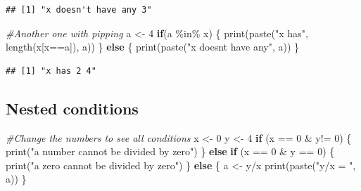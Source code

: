 \documentclass[
]{book}
\newenvironment{Shaded}{\begin{snugshade}}{\end{snugshade}}
\newcommand{\CommentTok}[1]{\textcolor[rgb]{0.56,0.35,0.01}{\textit{#1}}}
\newcommand{\ControlFlowTok}[1]{\textcolor[rgb]{0.13,0.29,0.53}{\textbf{#1}}}
\newcommand{\DecValTok}[1]{\textcolor[rgb]{0.00,0.00,0.81}{#1}}
\newcommand{\FunctionTok}[1]{\textcolor[rgb]{0.00,0.00,0.00}{#1}}
\newcommand{\NormalTok}[1]{#1}
\newcommand{\OtherTok}[1]{\textcolor[rgb]{0.56,0.35,0.01}{#1}}
\newcommand{\SpecialCharTok}[1]{\textcolor[rgb]{0.00,0.00,0.00}{#1}}
\newcommand{\StringTok}[1]{\textcolor[rgb]{0.31,0.60,0.02}{#1}}
\theoremstyle{definition}
\theoremstyle{definition}
\theoremstyle{definition}
\theoremstyle{definition}
\theoremstyle{remark}
\begin{document}
\begin{verbatim}
## [1] "x doesn't have any 3"
\end{verbatim}

\begin{Shaded}
\begin{Highlighting}[]
\CommentTok{\#Another one with pipping}
\NormalTok{a }\OtherTok{\textless{}{-}} \DecValTok{4}
\ControlFlowTok{if}\NormalTok{(a }\SpecialCharTok{\%in\%}\NormalTok{ x) \{}
  \FunctionTok{print}\NormalTok{(}\FunctionTok{paste}\NormalTok{(}\StringTok{"x has"}\NormalTok{, }\FunctionTok{length}\NormalTok{(x[x}\SpecialCharTok{==}\NormalTok{a]), a))}
\NormalTok{\} }\ControlFlowTok{else}\NormalTok{ \{}
  \FunctionTok{print}\NormalTok{(}\FunctionTok{paste}\NormalTok{(}\StringTok{"x doesn\textquotesingle{}t have any"}\NormalTok{, a))}
\NormalTok{\}}
\end{Highlighting}
\end{Shaded}

\begin{verbatim}
## [1] "x has 2 4"
\end{verbatim}

\hypertarget{nested-conditions}{%
\subsection{Nested conditions}\label{nested-conditions}}

\begin{Shaded}
\begin{Highlighting}[]
\CommentTok{\#Change the numbers to see all conditions}
\NormalTok{x }\OtherTok{\textless{}{-}} \DecValTok{0}
\NormalTok{y }\OtherTok{\textless{}{-}} \DecValTok{4}
\ControlFlowTok{if}\NormalTok{ (x }\SpecialCharTok{==} \DecValTok{0} \SpecialCharTok{\&}\NormalTok{ y}\SpecialCharTok{!=} \DecValTok{0}\NormalTok{) \{}
  \FunctionTok{print}\NormalTok{(}\StringTok{"a number cannot be divided by zero"}\NormalTok{)}
\NormalTok{\} }\ControlFlowTok{else} \ControlFlowTok{if}\NormalTok{ (x }\SpecialCharTok{==} \DecValTok{0} \SpecialCharTok{\&}\NormalTok{ y }\SpecialCharTok{==} \DecValTok{0}\NormalTok{) \{}
  \FunctionTok{print}\NormalTok{(}\StringTok{"a zero cannot be divided by zero"}\NormalTok{)}
\NormalTok{\} }\ControlFlowTok{else}\NormalTok{ \{}
\NormalTok{  a }\OtherTok{\textless{}{-}}\NormalTok{ y}\SpecialCharTok{/}\NormalTok{x }
  \FunctionTok{print}\NormalTok{(}\FunctionTok{paste}\NormalTok{(}\StringTok{"y/x = "}\NormalTok{, a))}
\NormalTok{\}}
\end{Highlighting}
\end{Shaded}
\end{document}
